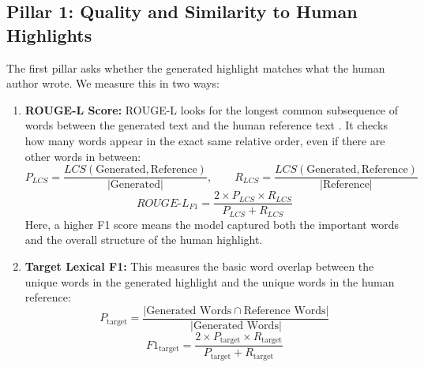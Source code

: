 \documentclass[11pt,a4paper]{article}
\begin{document}
\subsection{Pillar 1: Quality and Similarity to Human Highlights}
The first pillar asks whether the generated highlight matches what the human author wrote. We measure this in two ways:
\begin{enumerate}
    \item \textbf{ROUGE-L Score:} ROUGE-L looks for the longest common subsequence of words between the generated text and the human reference text \cite{lin2004rouge}. It checks how many words appear in the exact same relative order, even if there are other words in between:
    \begin{equation}
        P_{LCS} = \frac{LCS(\text{Generated}, \text{Reference})}{|\text{Generated}|}, \qquad R_{LCS} = \frac{LCS(\text{Generated}, \text{Reference})}{|\text{Reference}|}
    \end{equation}
    \begin{equation}
        ROUGE\text{-}L_{F1} = \frac{2 \times P_{LCS} \times R_{LCS}}{P_{LCS} + R_{LCS}}
    \end{equation}
    Here, a higher F1 score means the model captured both the important words and the overall structure of the human highlight.
    \item \textbf{Target Lexical F1:} This measures the basic word overlap between the unique words in the generated highlight and the unique words in the human reference:
    \begin{equation}
        P_{\text{target}} = \frac{|\text{Generated Words} \cap \text{Reference Words}|}{|\text{Generated Words}|}
    \end{equation}
    \begin{equation}
        F1_{\text{target}} = \frac{2 \times P_{\text{target}} \times R_{\text{target}}}{P_{\text{target}} + R_{\text{target}}}
    \end{equation}
\end{enumerate}
\end{document}
